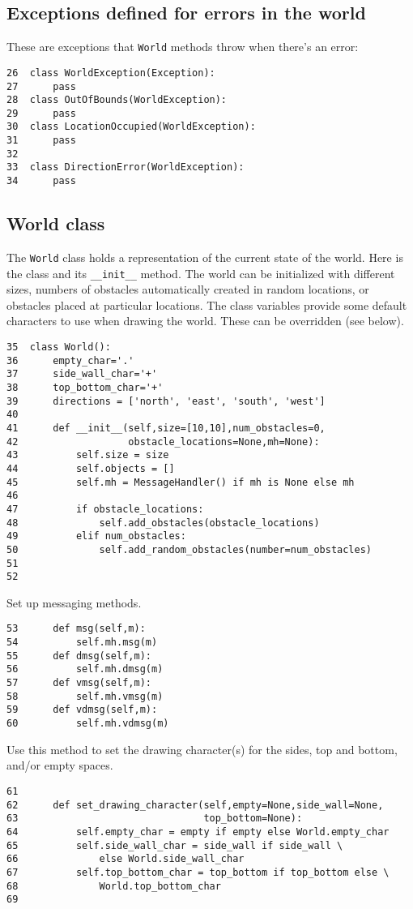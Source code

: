 \documentclass[11pt]{tufte-handout}
\begin{document}
\subsection{Exceptions defined for errors in the world}
\label{sec:orge5b743c}
These are exceptions that \texttt{World} methods throw when there's an error:
\begin{verbatim}
26  class WorldException(Exception):
27      pass
28  class OutOfBounds(WorldException):
29      pass
30  class LocationOccupied(WorldException):
31      pass
32  
33  class DirectionError(WorldException):
34      pass
\end{verbatim}

\subsection{World class}
\label{sec:org83aa4eb}

The \texttt{World} class holds a representation of the current state of the world. Here is the class and its \texttt{\_\_init\_\_} method.  The world can be initialized with different sizes, numbers of obstacles automatically created in random locations, or obstacles placed at particular locations.  The class variables provide some default characters to use when drawing the world.  These can be overridden (see below).

\begin{verbatim}
35  class World():
36      empty_char='.'
37      side_wall_char='+'
38      top_bottom_char='+'
39      directions = ['north', 'east', 'south', 'west']
40  
41      def __init__(self,size=[10,10],num_obstacles=0,
42                   obstacle_locations=None,mh=None):
43          self.size = size
44          self.objects = []
45          self.mh = MessageHandler() if mh is None else mh
46  
47          if obstacle_locations:
48              self.add_obstacles(obstacle_locations)
49          elif num_obstacles:
50              self.add_random_obstacles(number=num_obstacles)
51  
52  
\end{verbatim}

Set up messaging methods.

\begin{verbatim}
53      def msg(self,m):
54          self.mh.msg(m)
55      def dmsg(self,m):
56          self.mh.dmsg(m)
57      def vmsg(self,m):
58          self.mh.vmsg(m)
59      def vdmsg(self,m):
60          self.mh.vdmsg(m)
\end{verbatim}

Use this method to set the drawing character(s) for the sides, top and bottom, and/or empty spaces.
\begin{verbatim}
61  
62      def set_drawing_character(self,empty=None,side_wall=None,
63                                top_bottom=None):
64          self.empty_char = empty if empty else World.empty_char
65          self.side_wall_char = side_wall if side_wall \
66              else World.side_wall_char
67          self.top_bottom_char = top_bottom if top_bottom else \
68              World.top_bottom_char
69  
\end{verbatim}
\end{document}
